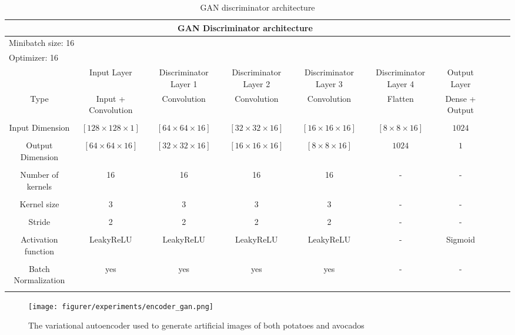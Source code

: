 \documentclass[11pt]{article}
\begin{document}
  \begin{table}[h!]
  \centering
  \begin{adjustbox}{max width=\textwidth}
  \begin{tabular}{*{10}{c}}%
  \hline
  \multicolumn{7}{c}{GAN Discriminator architecture}
  \\
  \hline
  \multicolumn{7}{l}{Minibatch size: 16} \\
  \multicolumn{7}{l}{Optimizer: 16} \\
  \hline
   & Input Layer & Discriminator Layer 1 & Discriminator Layer 2 & Discriminator Layer 3 & Discriminator Layer 4 & Output Layer \\
  \hline
  \hline
  Type & Input + Convolution & Convolution &  Convolution &  Convolution &  Flatten & Dense + Output \\ \\
  \hline
  Input Dimension & $[128 \times 128 \times 1]$  & $[64 \times 64 \times 16]$ & $[32 \times 32 \times 16]$ & $[16 \times 16 \times 16]$ & $[8 \times 8 \times 16]$ & $1024$ \\ \\
  \hline
  Output Dimension & $[64 \times 64 \times 16]$ & $[32 \times 32 \times 16]$ & $[16 \times 16 \times 16]$ & $[8 \times 8 \times 16]$ & $1024$ & $1$ \\ \\
  \hline
  Number of kernels & 16 & 16 & 16 & 16 & - & -  \\ \\
  \hline
  Kernel size & 3 & 3 & 3 & 3 & - & - \\ \\
  \hline
  Stride & 2 & 2 & 2 & 2 & - & - \\ \\
  \hline
  Activation function & LeakyReLU & LeakyReLU & LeakyReLU & LeakyReLU & - & Sigmoid  \\ \\
  \hline
  Batch Normalization & yes & yes & yes & yes & - & - \\ \\
  \hline
\end{tabular}
\end{adjustbox}
  \caption{GAN discriminator architecture}
  \label{tab:experiments_gan_discriminator}
\end{table}

\begin{figure}[!h]
    \centering
    \texttt{[image: figurer/experiments/encoder\_gan.png]}
    \caption{The variational autoencoder used to generate artificial images of both potatoes and avocados}
    \label{fig:experiment_gan_encoder}
\end{figure}
\end{document}
